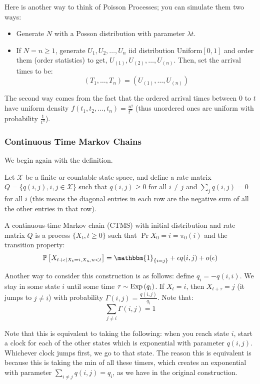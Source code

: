 Here is another way to think of Poisson Processes; you can simulate them two ways:
\begin{itemize}
    \item Generate $N$ with a Posson distribution with parameter $\lambda t$.
    \item If $N = n \geq 1$, generate $U_1, U_2, \dots, U_n$ iid distribution Uniform$[0, 1]$ and
    order them (order statistics) to get, $U_{(1)}, U_{(2)}, \dots, U_{(n)}$. Then,
    set the arrival times to be:
    \[ (T_1, \dots, T_n) = (U_{(1)}, \dots, U_{(n)}) \]
\end{itemize}

The second way comes from the fact that the ordered arrival times between $0$ to $t$
have uniform density $f(t_1, t_2, \dots, t_n) = \frac{n!}{t^n}$ (thus unordered ones are uniform with probability $\frac{1}{t^n}$).

\subsubsection{Continuous Time Markov Chains}
We begin again with the definition.
\begin{definition}
    Let $\mathcal{X}$ be a finite or countable state space, and define a rate matrix $Q = \{q(i, j), i, j \in \mathcal{X}\}$
    such that $q(i, j) \geq 0$ for all $i \neq j$ and $\sum_{j} q(i, j) = 0$ for all $i$ (this means the
    diagonal entries in each row are the negative sum of all the other entries in that row).

    A continuous-time Markov chain (CTMS) with initial distribution and rate matrix $Q$ is a process
    $\{X_t, t \geq 0\}$ such that $\Pr{X_0 = i} = \pi_0(i)$ and the transition property:
    \[ \Pr{X_{t + \epsilon \mid X_t = i, X_u, u < t}} = \mathbbm{1}_{\{i = j\}} + \epsilon q(i, j) + o(\epsilon) \]

    Another way to consider this construction is as follows:
    define $q_i = -q(i, i)$. We stay in some state $i$ until some time $\tau \sim \text{Exp}\left( q_i \right)$. If $X_t = i$,
    then $X_{t + \tau} = j$ (it jumps to $j \neq i$) with probability $\Gamma(i, j) = \frac{q(i,j)}{q_i}$.
    Note that:
    \[ \sum_{j \neq i} \Gamma(i, j) = 1 \]
\end{definition}

Note that this is equivalent to taking the following: when you reach state $i$, start a clock for each of the other states
which is exponential with parameter $q(i, j)$. Whichever clock jumps first, we go to that state. The reason this is equivalent is because
this is taking the min of all these timers, which creates an exponential with parameter $\sum_{i \neq j} q(i, j) = q_i$, as we
have in the original construction.